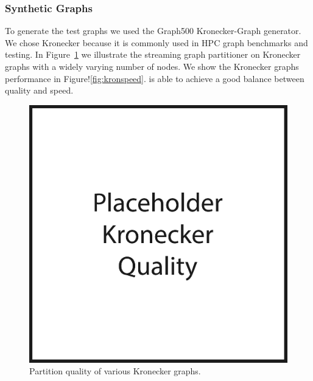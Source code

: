 
\subsubsection{Synthetic Graphs}
To generate the test graphs we used the Graph500 Kronecker-Graph generator.
We chose Kronecker because it is commonly used in HPC graph benchmarks and testing. 
In Figure~\ref{fig:kronqual} we illustrate the streaming graph partitioner on Kronecker graphs with a widely varying number of nodes.
We show the Kronecker graphs performance in Figure!\ref{fig:kronspeed}. 
\ourmethod is able to achieve a good balance between quality and speed.

\begin{figure}[h!]
\centering
  \includegraphics[width=0.8\columnwidth]{figures/kronecker_quality_tests.pdf}
  \caption{Partition quality of various Kronecker graphs.}
  \label{fig:kronqual}
\end{figure}

